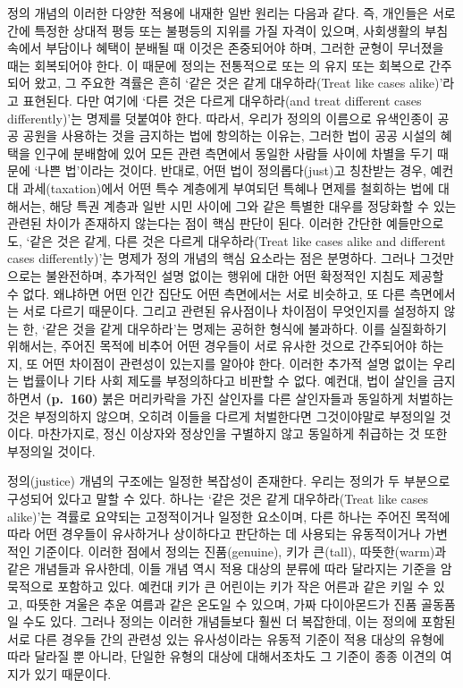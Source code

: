 정의 개념의 이러한 다양한 적용에 내재한 일반 원리는 다음과 같다. 즉,
개인들은 서로 간에 특정한 상대적 평등 또는 불평등의 지위를 가질 자격이
있으며, 사회생활의 부침 속에서 부담이나 혜택이 분배될 때 이것은
존중되어야 하며, 그러한 균형이 무너졌을 때는 회복되어야 한다. 이 때문에
정의는 전통적으로  또는 의
유지 또는 회복으로 간주되어 왔고, 그 주요한 격률은 흔히 `같은 것은 같게
대우하라(Treat like cases alike)'라고 표현된다. 다만 여기에 `다른 것은
다르게 대우하라(and treat different cases differently)'는 명제를
덧붙여야 한다. 따라서, 우리가 정의의 이름으로 유색인종이 공공 공원을
사용하는 것을 금지하는 법에 항의하는 이유는, 그러한 법이 공공 시설의
혜택을 인구에 분배함에 있어 모든 관련 측면에서 동일한 사람들 사이에
차별을 두기 때문에 `나쁜 법'이라는 것이다. 반대로, 어떤 법이
정의롭다(just)고 칭찬받는 경우, 예컨대 과세(taxation)에서 어떤 특수
계층에게 부여되던 특혜나 면제를 철회하는 법에 대해서는, 해당 특권 계층과
일반 시민 사이에 그와 같은 특별한 대우를 정당화할 수 있는 관련된 차이가
존재하지 않는다는 점이 핵심 판단이 된다. 이러한 간단한 예들만으로도,
`같은 것은 같게, 다른 것은 다르게 대우하라(Treat like cases alike and
different cases differently)'는 명제가 정의 개념의 핵심 요소라는 점은
분명하다. 그러나 그것만으로는 불완전하며, 추가적인 설명 없이는 행위에
대한 어떤 확정적인 지침도 제공할 수 없다. 왜냐하면 어떤 인간 집단도 어떤
측면에서는 서로 비슷하고, 또 다른 측면에서는 서로 다르기 때문이다.
그리고 관련된 유사점이나 차이점이 무엇인지를 설정하지 않는 한, `같은
것을 같게 대우하라'는 명제는 공허한 형식에 불과하다. 이를 실질화하기
위해서는, 주어진 목적에 비추어 어떤 경우들이 서로 유사한 것으로
간주되어야 하는지, 또 어떤 차이점이 관련성이 있는지를 알아야 한다.
이러한 추가적 설명 없이는 우리는 법률이나 기타 사회 제도를 부정의하다고
비판할 수 없다. 예컨대, 법이 살인을 금지하면서 \textbf{(p.~160)} 붉은
머리카락을 가진 살인자를 다른 살인자들과 동일하게 처벌하는 것은
부정의하지 않으며, 오히려 이들을 다르게 처벌한다면 그것이야말로 부정의일
것이다. 마찬가지로, 정신 이상자와 정상인을 구별하지 않고 동일하게
취급하는 것 또한 부정의일 것이다.

정의(justice) 개념의 구조에는 일정한 복잡성이 존재한다. 우리는 정의가 두
부분으로 구성되어 있다고 말할 수 있다. 하나는 `같은 것은 같게
대우하라(Treat like cases alike)'는 격률로 요약되는 고정적이거나 일정한
요소이며, 다른 하나는 주어진 목적에 따라 어떤 경우들이 유사하거나
상이하다고 판단하는 데 사용되는 유동적이거나 가변적인 기준이다. 이러한
점에서 정의는 진품(genuine), 키가 큰(tall), 따뜻한(warm)과 같은 개념들과
유사한데, 이들 개념 역시 적용 대상의 분류에 따라 달라지는 기준을
암묵적으로 포함하고 있다. 예컨대 키가 큰 어린이는 키가 작은 어른과 같은
키일 수 있고, 따뜻한 겨울은 추운 여름과 같은 온도일 수 있으며, 가짜
다이아몬드가 진품 골동품일 수도 있다. 그러나 정의는 이러한 개념들보다
훨씬 더 복잡한데, 이는 정의에 포함된 서로 다른 경우들 간의 관련성 있는
유사성이라는 유동적 기준이 적용 대상의 유형에 따라 달라질 뿐 아니라,
단일한 유형의 대상에 대해서조차도 그 기준이 종종 이견의 여지가 있기
때문이다.

